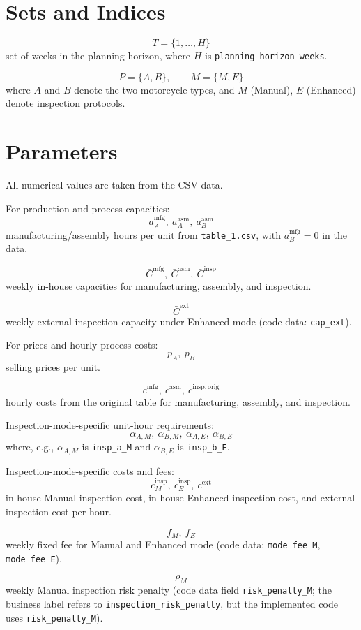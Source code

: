 \section*{Sets and Indices}

\[
T=\{1,\dots,H\}
\]
set of weeks in the planning horizon, where \(H\) is \texttt{planning\_horizon\_weeks}.

\[
P=\{A,B\}, \qquad M=\{M,E\}
\]
where \(A\) and \(B\) denote the two motorcycle types, and \(M\) (Manual), \(E\) (Enhanced) denote inspection protocols.

\section*{Parameters}

All numerical values are taken from the CSV data.

For production and process capacities:
\[
a^{\mathrm{mfg}}_A,\ a^{\mathrm{asm}}_A,\ a^{\mathrm{asm}}_B
\]
manufacturing/assembly hours per unit from \texttt{table\_1.csv}, with \(a^{\mathrm{mfg}}_B=0\) in the data.

\[
\bar C^{\mathrm{mfg}},\ \bar C^{\mathrm{asm}},\ \bar C^{\mathrm{insp}}
\]
weekly in-house capacities for manufacturing, assembly, and inspection.

\[
\bar C^{\mathrm{ext}}
\]
weekly external inspection capacity under Enhanced mode (code data: \texttt{cap\_ext}).

For prices and hourly process costs:
\[
p_A,\ p_B
\]
selling prices per unit.

\[
c^{\mathrm{mfg}},\ c^{\mathrm{asm}},\ c^{\mathrm{insp,orig}}
\]
hourly costs from the original table for manufacturing, assembly, and inspection.

Inspection-mode-specific unit-hour requirements:
\[
\alpha_{A,M},\ \alpha_{B,M},\ \alpha_{A,E},\ \alpha_{B,E}
\]
where, e.g., \(\alpha_{A,M}\) is \texttt{insp\_a\_M} and \(\alpha_{B,E}\) is \texttt{insp\_b\_E}.

Inspection-mode-specific costs and fees:
\[
c^{\mathrm{insp}}_M,\ c^{\mathrm{insp}}_E,\ c^{\mathrm{ext}}
\]
in-house Manual inspection cost, in-house Enhanced inspection cost, and external inspection cost per hour.

\[
f_M,\ f_E
\]
weekly fixed fee for Manual and Enhanced mode (code data: \texttt{mode\_fee\_M}, \texttt{mode\_fee\_E}).

\[
\rho_M
\]
weekly Manual inspection risk penalty (code data field \texttt{risk\_penalty\_M}; the business label refers to \texttt{inspection\_risk\_penalty}, but the implemented code uses \texttt{risk\_penalty\_M}).

